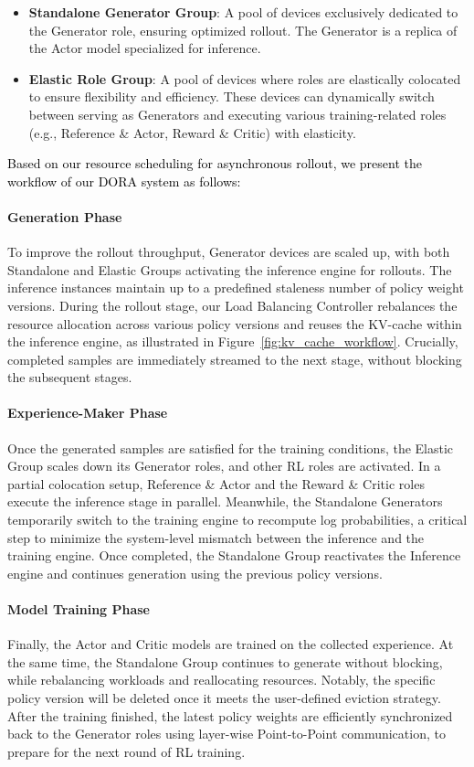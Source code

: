 \begin{itemize}
\item\textbf{Standalone Generator Group}: A pool of devices exclusively dedicated to the Generator role, ensuring optimized rollout. The Generator is a replica of the Actor model specialized for inference.
\item\textbf{Elastic Role Group}: A pool of devices where roles are elastically colocated to ensure flexibility and efficiency. These devices can dynamically switch between serving as Generators and executing various training-related roles (e.g., Reference \& Actor, Reward \& Critic) with elasticity.
\end{itemize}

\textcolor{black}{Based on our resource scheduling for asynchronous rollout, we present the workflow of our DORA system as follows:}

\noindent\paragraph{Generation Phase} To improve the rollout throughput, Generator devices are scaled up, with both Standalone and Elastic Groups activating the inference engine for rollouts. The inference instances maintain up to a predefined staleness number of policy weight versions. During the rollout stage, our Load Balancing Controller rebalances the resource allocation across various policy versions and reuses the KV-cache within the inference engine, as illustrated in Figure~\ref{fig:kv_cache_workflow}. Crucially, completed samples are immediately streamed to the next stage, without blocking the subsequent stages.
\noindent\paragraph{Experience-Maker Phase} Once the generated samples are satisfied for the training conditions, the Elastic Group scales down its Generator roles, and other RL roles are activated. In a partial colocation setup, Reference \& Actor and the Reward \& Critic roles execute the inference stage in parallel. Meanwhile, the Standalone Generators temporarily switch to the training engine to recompute log probabilities, a critical step to minimize the system-level mismatch between the inference and the training engine. Once completed, the Standalone Group reactivates the Inference engine and continues generation using the previous policy versions. 
\noindent\paragraph{Model Training Phase} Finally, the Actor and Critic models are trained on the collected experience. At the same time, the Standalone Group continues to generate without blocking, while rebalancing workloads and reallocating resources. Notably, the specific policy version will be deleted once it meets the user-defined eviction strategy. After the training finished, the latest policy weights are efficiently synchronized back to the Generator roles using layer-wise Point-to-Point communication, to prepare for the next round of RL training.


